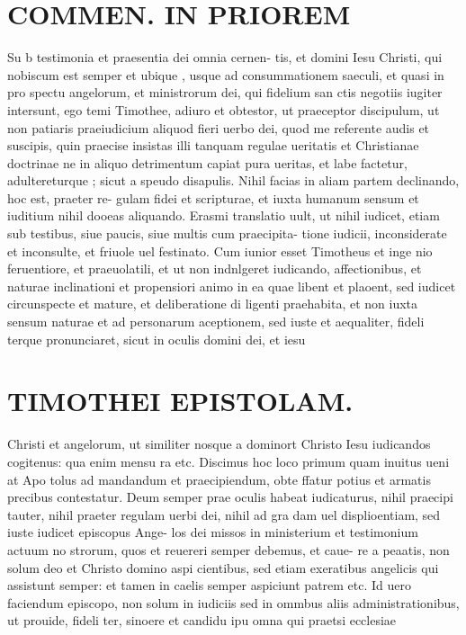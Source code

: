 \documentclass{article}
\begin{document}
\begin{pages}
\section*{COMMEN. IN PRIOREM }
\marginpar{[ p.146 ]}\pstart Su b testimonia et praesentia dei omnia cernen- tis, et domini Iesu Christi, qui nobiscum est semper et ubique , usque ad consummationem saeculi, et quasi in pro spectu angelorum, et ministrorum dei, qui fidelium san ctis negotiis iugiter intersunt, ego temi Timothee, adiuro et obtestor, ut praeceptor discipulum, ut non patiaris praeiudicium aliquod fieri uerbo dei, quod me referente audis et suscipis, quin praecise insistas illi tanquam regulae ueritatis et Christianae doctrinae ne in aliquo detrimentum capiat pura ueritas, et labe factetur, adultereturque ; sicut a speudo disapulis. Nihil facias in aliam partem declinando, hoc est, praeter re- gulam fidei et scripturae, et iuxta humanum sensum et iuditium nihil dooeas aliquando.  \pend\pstart Erasmi translatio uult, ut nihil iudicet, etiam sub testibus, siue paucis, siue multis cum praecipita- tione iudicii, inconsiderate et inconsulte, et friuole uel festinato. Cum iunior esset Timotheus et inge nio feruentiore, et praeuolatili, et ut non indnlgeret iudicando, affectionibus, et naturae inclinationi et propensiori animo in ea quae libent et plaoent, sed iudicet circunspecte et mature, et deliberatione di ligenti praehabita, et non iuxta sensum naturae et ad personarum aceptionem, sed iuste et aequaliter, fideli terque pronunciaret, sicut in oculis domini dei, et iesu  \pend
\section*{TIMOTHEI EPISTOLAM. }
\marginpar{[ p.147 ]}\pstart Christi et angelorum, ut similiter nosque a dominort Christo Iesu iudicandos cogitenus: qua enim mensu ra etc. Discimus hoc loco primum quam inuitus ueni at Apo tolus ad mandandum et praecipiendum, obte ffatur potius et armatis precibus contestatur. Deum semper prae oculis habeat iudicaturus, nihil praecipi tauter, nihil praeter regulam uerbi dei, nihil ad gra dam uel displioentiam, sed iuste iudicet episcopus Ange- los dei missos in ministerium et testimonium actuum no strorum, quos et reuereri semper debemus, et caue- re a peaatis, non solum deo et Christo domino aspi cientibus, sed etiam exeratibus angelicis qui assistunt semper: et tamen in caelis semper aspiciunt patrem etc. Id uero faciendum episcopo, non solum in iudiciis sed in ommbus aliis administrationibus, ut prouide, fideli ter, sinoere et candidu ipu omna qui praetsi ecclesiae  \pend
{}
{}

\end{pages}
\end{document}
